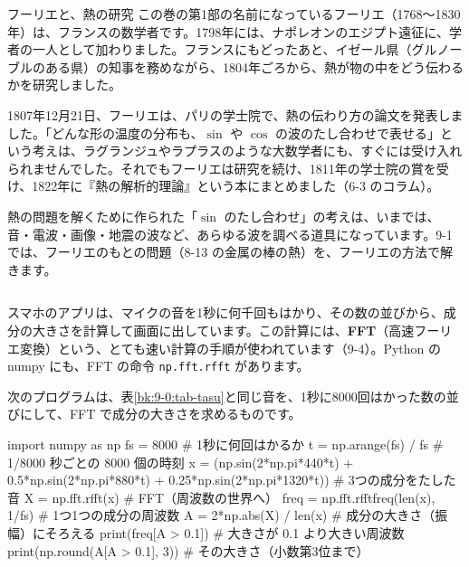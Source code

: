 \begin{column}{フーリエと、熱の研究}
この巻の第1部の名前になっているフーリエ（1768〜1830年）は、フランスの数学者です。1798年には、ナポレオンのエジプト遠征に、学者の一人として加わりました。フランスにもどったあと、イゼール県（グルノーブルのある県）の知事を務めながら、1804年ごろから、熱が物の中をどう伝わるかを研究しました。

1807年12月21日、フーリエは、パリの学士院で、熱の伝わり方の論文を発表しました。「どんな形の温度の分布も、$\sin$ や $\cos$ の波のたし合わせで表せる」という考えは、ラグランジュやラプラスのような大数学者にも、すぐには受け入れられませんでした。それでもフーリエは研究を続け、1811年の学士院の賞を受け、1822年に『熱の解析的理論』という本にまとめました（6-3 のコラム）。

熱の問題を解くために作られた「$\sin$ のたし合わせ」の考えは、いまでは、音・電波・画像・地震の波など、あらゆる波を調べる道具になっています。9-1 では、フーリエのもとの問題（8-13 の金属の棒の熱）を、フーリエの方法で解きます。
\end{column}


\label{bk:9-0:fft}スマホのアプリは、マイクの音を1秒に何千回もはかり、その数の並びから、成分の大きさを計算して画面に出しています。この計算には、\textbf{FFT}（高速フーリエ変換）という、とても速い計算の手順が使われています（9-4）。Python の numpy にも、FFT の命令 \texttt{np.fft.rfft} があります。

次のプログラムは、表\ref{bk:9-0:tab-tasu}と同じ音を、1秒に8000回はかった数の並びにして、FFT で成分の大きさを求めるものです。

\begin{bkcode}[Python]
import numpy as np
fs = 8000                       \# 1秒に何回はかるか
t = np.arange(fs) / fs          \# 1/8000 秒ごとの 8000 個の時刻
x = (np.sin(2*np.pi*440*t) + 0.5*np.sin(2*np.pi*880*t)
     + 0.25*np.sin(2*np.pi*1320*t))   \# 3つの成分をたした音
X = np.fft.rfft(x)              \# FFT（周波数の世界へ）
freq = np.fft.rfftfreq(len(x), 1/fs)  \# 1つ1つの成分の周波数
A = 2*np.abs(X) / len(x)        \# 成分の大きさ（振幅）にそろえる
print(freq[A > 0.1])            \# 大きさが 0.1 より大きい周波数
print(np.round(A[A > 0.1], 3))  \# その大きさ（小数第3位まで）
\end{bkcode}
\begin{bkcodeout}[実行結果]
[ 440.  880. 1320.]
[1.   0.5  0.25]
\end{bkcodeout}

